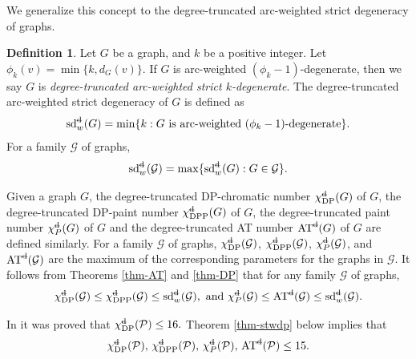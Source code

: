 \documentclass[11pt,a4paper]{article}
\theoremstyle{definition}
\newtheorem{definition}{Definition}
\begin{document}
We generalize this concept to the 
 {degree-truncated arc-weighted strict degeneracy} of graphs. 
 
 \begin{definition}
     \label{def-degree-truncated-st-deg}
     Let $G$ be a graph, and $k$ be a positive integer. Let $\phi_k(v) = \min\{k, d_G(v)\}$. If   
     $G$ is arc-weighted  $(\phi_k-1)$-degenerate, then we say 
       $G$ is {\em degree-truncated arc-weighted strict $k$-degenerate}.  
    The degree-truncated arc-weighted strict degeneracy of $G$ is defined as  $$\operatorname{sd}_{w}^{\text{\st{d}}}(G)= \min \{k: \text{$G$ is arc-weighted  $(\phi_k-1)$-degenerate}\}.$$ 
    For a family $\mathcal{G}$ of graphs, 
    $$\operatorname{sd}_w^{\text{\st{d}}}(\mathcal{G})=\max \{ \operatorname{sd}_w^{\text{\st{d}}}(G): G \in \mathcal{G}\}.$$
\end{definition}



 


Given a graph $G$, the degree-truncated DP-chromatic number $\chi_{\mathrm{DP}}^{\text{\st{d}}}(G)$ of $G$, the degree-truncated DP-paint number $\chi_{\mathrm{DPP}}^{\text{\st{d}}}(G)$ of $G$, the degree-truncated paint number $\chi_{P}^{\text{\st{d}}}(G)$ of $G$ and the degree-truncated AT number $\operatorname{AT}^{\text{\st{d}}}(G)$ of $G$ are defined similarly. For a family $\mathcal{G}$ of graphs,  
$\chi_{\mathrm{DP}}^{\text{\st{d}}}(\mathcal{G})$, 
$\chi_{\mathrm{DPP}}^{\text{\st{d}}}(\mathcal{G})$,
$\chi_{P}^{\text{\st{d}}}(\mathcal{G})$, and 
$\operatorname{AT}^{\text{\st{d}}}(\mathcal{G})$ are the maximum of the corresponding parameters for the graphs in $\mathcal{G}$. It follows from Theorems \ref{thm-AT} and \ref{thm-DP} that for any family $\mathcal{G}$ of graphs, 
$$\chi_{\mathrm{DP}}^{\text{\st{d}}}(\mathcal{G}) \le \chi_{\mathrm{DPP}}^{\text{\st{d}}}(\mathcal{G}) \le \operatorname{sd}_w^{\text{\st{d}}}(\mathcal{G}),  \text{ and }   \chi_{P}^{\text{\st{d}}}(\mathcal{G}) \le \operatorname{AT}^{\text{\st{d}}}(\mathcal{G}) \le \operatorname{sd}_w^{\text{\st{d}}}(\mathcal{G}).$$

 In \cite{ZZZ25} it was proved that $\chi_{\mathrm{DP}}^{\text{\st{d}}}(\mathcal{P}) \le 16.$
 Theorem \ref{thm-stwdp} below implies that $$\chi_{\mathrm{DP}}^{\text{\st{d}}}(\mathcal{P}), \, \chi_{\mathrm{DPP}}^{\text{\st{d}}}(\mathcal{P}),   \, \chi_{P}^{\text{\st{d}}}(\mathcal{P}),\,  \operatorname{AT}^{\text{\st{d}}}(\mathcal{P}) \le 15.$$ 
\end{document}
